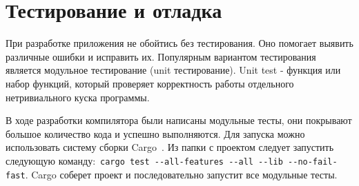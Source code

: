 \chapter{Тестирование и отладка}
\label{ch:chap4_soft_testing}

При разработке приложения не обойтись без тестирования.
Оно помогает выявить различные ошибки и исправить их.
Популярным вариантом тестирования является модульное тестирование (unit тестирование).
Unit test - функция или набор функций, который проверяет корректность работы отдельного нетривиального куска программы.

В ходе разработки компилятора были написаны модульные тесты, они покрывают большое количество кода и успешно выполняются.
Для запуска можно использовать систему сборки Cargo~\cite{CargoBook}.
Из папки с проектом следует запустить следующую команду:~\lstinline{cargo test --all-features --all --lib --no-fail-fast}.
Cargo соберет проект и последовательно запустит все модульные тесты.




